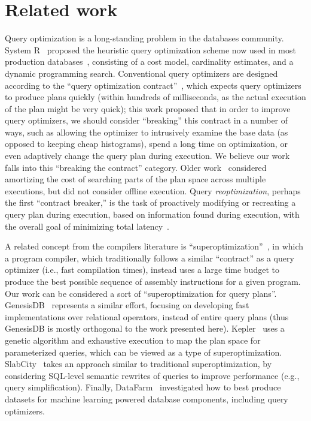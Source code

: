 \section{Related work}

Query optimization is a long-standing problem in the databases community. System R~\cite{system_r} proposed the heuristic query optimization scheme now used in most production databases~\cite{cascades}, consisting of a cost model, cardinality estimates, and a dynamic programming search.
Conventional query optimizers are designed according to the ``query optimization contract''~\cite{chaudhuri2009_rethinking_qo}, which expects query optimizers to produce plans quickly (within hundreds of milliseconds, as the actual execution of the plan might be very quick); this work proposed that in order to improve query optimizers, we should consider ``breaking'' this contract in a number of ways, such as allowing the optimizer to intrusively examine the base data (as opposed to keeping cheap histograms), spend a long time on optimization, or even adaptively change the query plan during execution. We believe our work falls into this ``breaking the contract'' category. Older work~\cite{fittest_qo} considered amortizing the cost of searching parts of the plan space across multiple executions, but did not consider offline execution. Query \emph{reoptimization}, perhaps the first ``contract breaker,'' is the task of proactively modifying or recreating a query plan during execution, based on information found during execution, with the overall goal of minimizing total latency~\cite{reopt,rio_reopt,inc_reopt}.


A related concept from the compilers literature is ``superoptimization''~\cite{superopt_coined}, in which a program compiler, which traditionally follows a similar ``contract'' as a query optimizer (i.e., fast compilation times), instead uses a large time budget to produce the best possible sequence of assembly instructions for a given program. Our work can be considered a sort of ``superoptimization for query plans''. GenesisDB~\cite{genesisdb} represents a similar effort, focusing on developing fast implementations over relational operators, instead of entire query plans (thus GenesisDB is mostly orthogonal to the work presented here). Kepler~\cite{kepler} uses a genetic algorithm and exhaustive execution to map the plan space for parameterized queries, which can be viewed as a type of superoptimization. SlabCity~\cite{slabcity} takes an approach similar to traditional superoptimization, by considering SQL-level semantic rewrites of queries to improve performance (e.g., query simplification). Finally, DataFarm~\cite{datafarm}  investigated how to best produce datasets for machine learning powered database components, including query optimizers.

